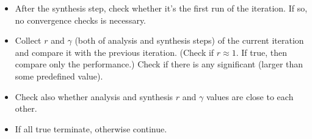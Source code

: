 \begin{itemize}
	\item After the synthesis step, check whether it's the first run of the iteration. If so, no convergence checks is
	necessary.
	\item Collect $r$ and $\gamma$ (both of analysis and synthesis steps) of the current iteration and compare it with 
	the previous iteration. (Check if $r\approx 1$. If true, then compare only the performance.) Check if there is any 
	significant (larger than some predefined value).
	\item Check also whether analysis and synthesis $r$ and $\gamma$ values are close to each other. 
	\item If all true terminate, otherwise continue. 
\end{itemize}



%
%
%

